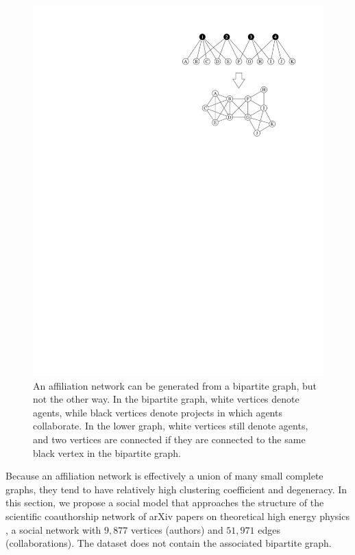 \documentclass[11pt,a4paper]{article}
\begin{document}
\begin{figure}[htbp]
	\centering
	\includegraphics[scale=1]{affiliation.pdf}
	\caption{An affiliation network can be generated from a bipartite graph, but not the other way. In the bipartite graph, white vertices denote agents, while black vertices denote projects in which agents collaborate. In the lower graph, white vertices still denote agents, and two vertices are connected if they are connected to the same black vertex in the bipartite graph.}
	\label{fig:affiliation}
\end{figure}

Because an affiliation network is effectively a union of many small complete graphs, they tend to have relatively high clustering coefficient and degeneracy. In this section, we propose a social model that approaches the structure of the scientific coauthorship network of arXiv papers on theoretical high energy physics \cite{stanford_network_dataset}, a social network with $9,877$ vertices (authors) and $51,971$ edges (collaborations). The dataset does not contain the associated bipartite graph.
\end{document}
